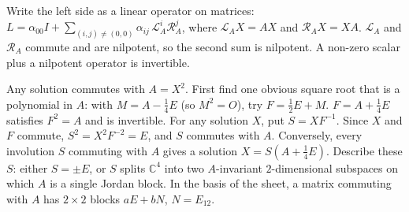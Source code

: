 \documentclass[11pt,a4paper]{article}
\begin{document}
Write the left side as a linear operator on matrices: \(L=\alpha_{00}I+\sum_{(i,j)\ne(0,0)}\alpha_{ij}\,\mathcal L_A^i\mathcal R_A^j\), where \(\mathcal L_A X=AX\) and \(\mathcal R_AX=XA\).
\(\mathcal L_A\) and \(\mathcal R_A\) commute and are nilpotent, so the second sum is nilpotent. A non-zero scalar plus a nilpotent operator is invertible.

Any solution commutes with \(A=X^2\). First find one obvious square root that is a polynomial in \(A\): with \(M=A-\frac14E\) (so \(M^2=O\)), try \(F=\frac12E+M\).
\(F=A+\frac14E\) satisfies \(F^2=A\) and is invertible. For any solution \(X\), put \(S=XF^{-1}\). Since \(X\) and \(F\) commute, \(S^2=X^2F^{-2}=E\), and \(S\) commutes with \(A\).
Conversely, every involution \(S\) commuting with \(A\) gives a solution \(X=S(A+\frac14E)\). Describe these \(S\): either \(S=\pm E\), or \(S\) splits \(\mathbb C^4\) into two \(A\)-invariant \(2\)-dimensional subspaces on which \(A\) is a single Jordan block. In the basis of the sheet, a matrix commuting with \(A\) has \(2\times2\) blocks \(aE+bN\), \(N=E_{12}\).
\end{document}
